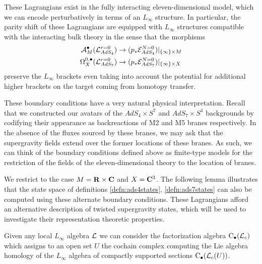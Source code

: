 \documentclass[../main.tex]{subfiles}
\begin{document}
These Lagrangians exist in the fully interacting eleven-dimensional model, which we can encode perturbatively in terms of an $L_\infty$ structure.
In particular, the parity shift of these Lagrangians are equipped with $L_\infty$ structures compatible with the interacting bulk theory in the sense that the morphisms
\begin{align*}
\mathcal A_M^\bullet (\mathcal{L}^{r=0}_{AdS_4} ) & \to (p_* \mathcal{E}^{N=0} _{AdS_4})|_{\{\infty\} \times M}\\
\Omega^{0,\bullet}_{X} (\mathcal{L}^{r=0}_{AdS_7} ) & \to (p_* \mathcal{E}^{N=0} _{AdS_7})|_{\{\infty\} \times X}
\end{align*}
preserve the $L_\infty$ brackets even taking into account the potential for additional higher brackets on the target coming from homotopy transfer. 

\begin{rmk}
These boundary conditions have a very natural physical interpretation. Recall that we constructed our avatars of the $AdS_4\times S^7$ and $AdS_7\times S^4$ backgrounds by codifying their appearance as backreactions of M2 and M5 branes respectively. In the absence of the fluxes sourced by these branes, we may ask that the supergravity fields extend over the former locations of these branes. As such, we can think of the boundary conditions defined above as finite-type models for the restriction of the fields of the eleven-dimensional theory to the location of branes. 
\end{rmk}

\parsec[]

We restrict to the case $M = \mathbf{R} \times \mathbf{C}$ and $X = \mathbf{C}^3$.
The following lemma illustrates that the state space of definitions \ref{defn:ads4states}, \ref{defn:ads7states} can also be computed using these alternate boundary conditions.
These Lagrangians afford an alternative description of twisted supergravity states, which will be used to investigate their representation theoretic properties.

Given any local $L_\infty$ algebra $\mathcal L$ we can consider the factorization algebra ${\mathrm{C}}_\bullet(\mathcal L_c)$ which assigns to an open set $U$ the cochain complex computing the Lie algebra homology of the $L_\infty$ algebra of compactly supported sections ${\mathrm{C}}_\bullet (\mathcal L_c(U))$.
\end{document}
